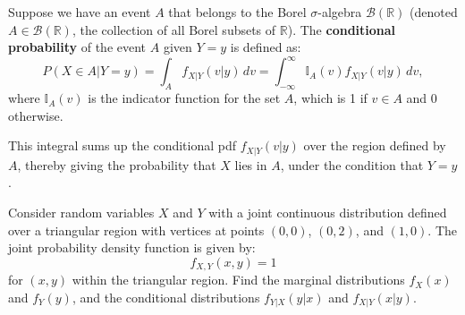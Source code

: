 \begin{definition}
    Suppose we have an event \( A \) that belongs to the Borel \(\sigma\)-algebra \( \mathcal{B}(\mathbb{R}) \) (denoted \( A \in \mathcal{B}(\mathbb{R}) \), the collection of all Borel subsets of \( \mathbb{R} \)). The \textbf{conditional probability} of the event \( A \) given \( Y = y \) is defined as:
   \[
   P(X \in A | Y = y) = \int_{A} f_{X|Y}(v | y) \, dv = \int_{-\infty}^{\infty} \mathbb{I}_A(v) f_{X|Y}(v | y) \, dv,
   \]
   where \( \mathbb{I}_A(v) \) is the indicator function for the set \( A \), which is 1 if \( v \in A \) and 0 otherwise.
\end{definition}

This integral sums up the conditional pdf \( f_{X|Y}(v | y) \) over the region defined by \( A \), thereby giving the probability that \( X \) lies in \( A \), under the condition that \( Y = y \).


\begin{exercise}
Consider random variables \( X \) and \( Y \) with a joint continuous distribution defined over a triangular region with vertices at points \( (0, 0) \), \( (0, 2) \), and \( (1, 0) \). The joint probability density function is given by:
\[
f_{X,Y}(x, y) = 1
\]
for \((x, y)\) within the triangular region. Find the marginal distributions \( f_X(x) \) and \( f_Y(y) \), and the conditional distributions \( f_{Y|X}(y|x) \) and \( f_{X|Y}(x|y) \).\\

\begin{center}
\end{center}

\end{exercise}

